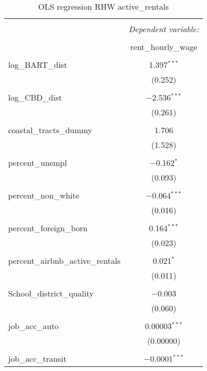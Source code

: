 \documentclass[10pt, letterpaper]{amsart}
\begin{document}
\begin{table}[H] \centering 
  \caption{OLS regression RHW active\_rentals} 
  \label{} 
  \begin{tabular}{@{\extracolsep{5pt}}lc} 
    \\[-1.8ex]\hline 
    \hline \\[-1.8ex] 
    & \multicolumn{1}{c}{\textit{Dependent variable:}} \\ 
    \cline{2-2} 
    \\[-1.8ex] & rent\_hourly\_wage \\ 
    \hline \\[-1.8ex] 
    log\_BART\_dist & 1.397$^{***}$ \\ 
    & (0.252) \\ 
    & \\ 
    log\_CBD\_dist & $-$2.536$^{***}$ \\ 
    & (0.261) \\ 
    & \\ 
    coastal\_tracts\_dummy & 1.706 \\ 
    & (1.528) \\ 
    & \\ 
    percent\_unempl & $-$0.162$^{*}$ \\ 
    & (0.093) \\ 
    & \\ 
    percent\_non\_white & $-$0.064$^{***}$ \\ 
    & (0.016) \\ 
    & \\ 
    percent\_foreign\_born & 0.164$^{***}$ \\ 
    & (0.023) \\ 
    & \\ 
    percent\_airbnb\_active\_rentals & 0.021$^{*}$ \\ 
    & (0.011) \\ 
    & \\ 
    School\_district\_quality & $-$0.003 \\ 
    & (0.060) \\ 
    & \\ 
    job\_acc\_auto & 0.00003$^{***}$ \\ 
    & (0.00000) \\ 
    & \\ 
    job\_acc\_transit & $-$0.0001$^{***}$ \\ 

\end{tabular}
\end{table}
\end{document}
